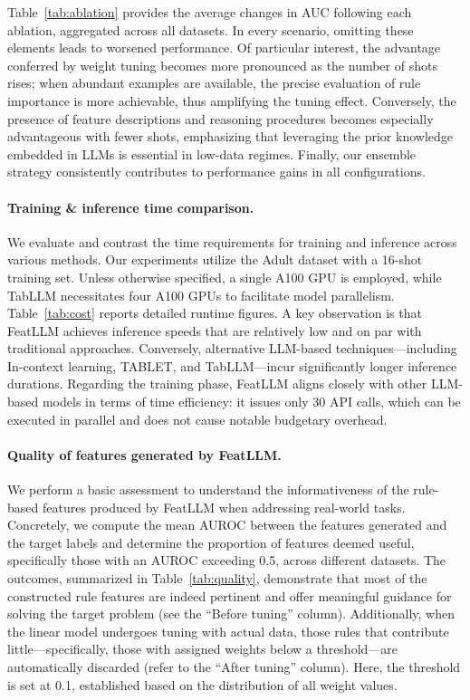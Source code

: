 Table~\ref{tab:ablation} provides the average changes in AUC following each ablation, aggregated across all datasets. In every scenario, omitting these elements leads to worsened performance. Of particular interest, the advantage conferred by weight tuning becomes more pronounced as the number of shots rises; when abundant examples are available, the precise evaluation of rule importance is more achievable, thus amplifying the tuning effect. Conversely, the presence of feature descriptions and reasoning procedures becomes especially advantageous with fewer shots, emphasizing that leveraging the prior knowledge embedded in LLMs is essential in low-data regimes. Finally, our ensemble strategy consistently contributes to performance gains in all configurations.

\vspace*{-0.12in}
\paragraph{Training \& inference time comparison.} We evaluate and contrast the time requirements for training and inference across various methods. Our experiments utilize the Adult dataset with a 16-shot training set. Unless otherwise specified, a single A100 GPU is employed, while TabLLM necessitates four A100 GPUs to facilitate model parallelism. Table~\ref{tab:cost} reports detailed runtime figures. A key observation is that \textsf{FeatLLM} achieves inference speeds that are relatively low and on par with traditional approaches. Conversely, alternative LLM-based techniques—including In-context learning, TABLET, and TabLLM—incur significantly longer inference durations. Regarding the training phase, \textsf{FeatLLM} aligns closely with other LLM-based models in terms of time efficiency: it issues only 30 API calls, which can be executed in parallel and does not cause notable budgetary overhead.

\vspace*{-0.12in}
\paragraph{Quality of features generated by \textsf{FeatLLM}.}
We perform a basic assessment to understand the informativeness of the rule-based features produced by \textsf{FeatLLM} when addressing real-world tasks. Concretely, we compute the mean AUROC between the features generated and the target labels and determine the proportion of features deemed useful, specifically those with an AUROC exceeding 0.5, across different datasets. 
The outcomes, summarized in Table~\ref{tab:quality}, demonstrate that most of the constructed rule features are indeed pertinent and offer meaningful guidance for solving the target problem (see the “Before tuning” column). Additionally, when the linear model undergoes tuning with actual data, those rules that contribute little—specifically, those with assigned weights below a threshold—are automatically discarded (refer to the “After tuning” column). Here, the threshold is set at 0.1, established based on the distribution of all weight values.

